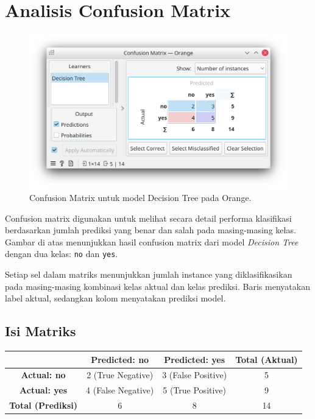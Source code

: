 \section{Analisis Confusion Matrix}

\begin{figure}[h]
	\centering
	\includegraphics[width=0.7\linewidth]{../figures/decision_tree_confusion_matrix.png}
	\caption{Confusion Matrix untuk model Decision Tree pada Orange.}
\end{figure}

Confusion matrix digunakan untuk melihat secara detail performa klasifikasi berdasarkan jumlah prediksi yang benar dan salah pada masing-masing kelas. Gambar di atas menunjukkan hasil confusion matrix dari model \textit{Decision Tree} dengan dua kelas: \texttt{no} dan \texttt{yes}. 

Setiap sel dalam matriks menunjukkan jumlah instance yang diklasifikasikan pada masing-masing kombinasi kelas aktual dan kelas prediksi. Baris menyatakan label aktual, sedangkan kolom menyatakan prediksi model.

\subsection*{Isi Matriks}

\begin{center}
	\begin{tabular}{|c|c|c|c|}
		\hline
		& \textbf{Predicted: no} & \textbf{Predicted: yes} & \textbf{Total (Aktual)} \\
		\hline
		\textbf{Actual: no} & 2 (True Negative) & 3 (False Positive) & 5 \\
		\textbf{Actual: yes} & 4 (False Negative) & 5 (True Positive) & 9 \\
		\hline
		\textbf{Total (Prediksi)} & 6 & 8 & 14 \\
		\hline
	\end{tabular}
\end{center}

